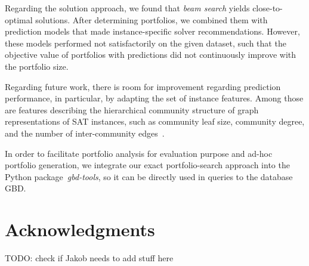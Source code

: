 \documentclass[conference]{IEEEtran}
\newcommand{\todo}[1]{{\color{red}TODO: #1}}
\begin{document}
Regarding the solution approach, we found that \emph{beam search} yields close-to-optimal solutions.
After determining portfolios, we combined them with prediction models that made instance-specific solver recommendations.
However, these models performed not satisfactorily on the given dataset, such that the objective value of portfolios with predictions did not continuously improve with the portfolio size.

Regarding future work, there is room for improvement regarding prediction performance, in particular, by adapting the set of instance features. 
Among those are features describing the hierarchical community structure of graph representations of SAT instances, such as community leaf size, community degree, and the number of inter-community edges~\cite{Li:2021:HCS}. 

In order to facilitate portfolio analysis for evaluation purpose and ad-hoc portfolio generation, we integrate our exact portfolio-search approach into the Python package~\emph{gbd-tools}, so it can be directly used in queries to the database GBD. 


\section*{Acknowledgments}

\todo{check if Jakob needs to add stuff here}

\balance %



\end{document}
